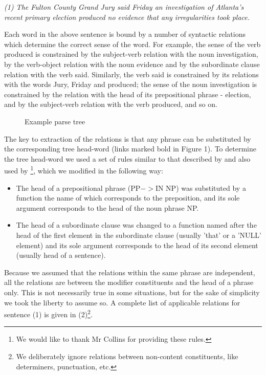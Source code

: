 \begin{center}
{\it (1) The Fulton County Grand Jury said Friday an investigation of Atlanta's recent primary election produced no evidence that any irregularities took place.}
\end{center}

Each word in the above sentence is bound by a number of syntactic relations which determine the correct sense of the word. For example, the sense of the verb produced is constrained by the subject-verb relation with the noun investigation, by the verb-object relation with the noun evidence and by the subordinate clause relation with the verb said. Similarly, the verb said is constrained by its relations with the words Jury, Friday and produced; the sense of the noun investigation is constrained by the relation with the head of its prepositional phrase - election, and by the subject-verb relation with the verb produced, and so on. 

\begin{figure}[t]
  \leavevmode
  \begin{center}
    \caption{Example parse tree}
    \label{fig:1}
  \end{center}
\end{figure}


The key to extraction of the relations is that any phrase can be substituted by the corresponding tree head-word (links marked bold in Figure 1). To determine the tree head-word we used a set of rules similar to that described by \cite{Magerman95}\cite{Jelinek94} and also used by \cite{Collins96}\footnote{
We would like to thank Mr Collins for providing these rules.
}, which we modified in the following way:

\begin{itemize}
\item 
The head of a prepositional phrase (PP$->$IN NP) was substituted by a function the name of which corresponds to the preposition, and its sole argument corresponds to the head of the noun phrase NP.

\item
The head of a subordinate clause was changed to a function named after the head of the first element in the subordinate clause (usually 'that' or a 'NULL' element) and its sole argument corresponds to the head of its second element (usually head of a sentence).
\end{itemize}

Because we assumed that the relations within the same phrase are independent, all the relations are between the modifier constituents and the head of a phrase only. This is not necessarily true in some situations, but for the sake of simplicity we took the liberty to assume so. A complete list of applicable relations for sentence (1) is given in (2)\footnote{
We deliberately ignore relations between non-content constituents, like determiners, punctuation, etc.
}.\\


